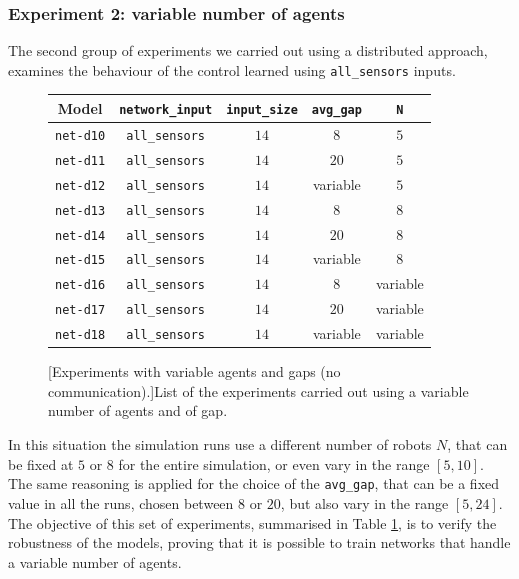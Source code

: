 \subsubsection{Experiment 2: variable number of agents}
\label{subsubsec:task1-exp-distr-2}
The second group of experiments we carried out using a distributed approach, 
examines the behaviour of the control learned using \texttt{all\_sensors} inputs. 
\begin{figure}[H]
	\centering
	\begin{tabular}{ccccc}
		\toprule
		\textbf{Model} \quad & \textbf{\texttt{network\_input}} & 
		\textbf{\texttt{input\_size}} & \textbf{\texttt{avg\_gap}} & \textbf{\texttt{N}}\\
		\midrule
		\texttt{net-d10} 	& \texttt{all\_sensors}		&  $14$  &  $8$		 	 &	$5$ \\
		\texttt{net-d11} 	& \texttt{all\_sensors}		&  $14$  &  $20$		&	$5$ \\
		\texttt{net-d12} 	& \texttt{all\_sensors}		&  $14$  &  variable   &	$5$ \\
		\texttt{net-d13} 	& \texttt{all\_sensors}	  	&  $14$  &  $8$			 &	  $8$ \\
		\texttt{net-d14} 	& \texttt{all\_sensors}	  	&  $14$  &  $20$   		&	 $8$ \\
		\texttt{net-d15} 	& \texttt{all\_sensors}	  	&  $14$  &  variable	&	 $8$ \\
		\texttt{net-d16} 	& \texttt{all\_sensors}	  	&  $14$  &  $ 8$		  &	 variable\\
		\texttt{net-d17} 	& \texttt{all\_sensors}	  	&  $14$  &  $20$		 &	variable\\
		\texttt{net-d18} 	& \texttt{all\_sensors}	  	&  $14$  &  variable	 &	
		variable\\
		\bottomrule
	\end{tabular}
	[Experiments with variable agents and gaps (no 
	communication).]{List of the experiments carried out using a variable 
		number of agents and of gap.}
	\label{tab:modeldist}
\end{figure}
In this situation the simulation runs use a different number of robots $N$, that 
can be fixed at $5$ or $8$ for the entire simulation, or even vary in the range $[5, 
10]$. The same reasoning is applied for the choice of the \texttt{avg\_gap}, that 
can be a fixed value in all the runs, chosen between $8$ or $20$, but also vary in 
the range $[5, 24]$. 
The objective of this set of experiments, summarised in Table \ref{tab:modeldist}, 
is to verify the robustness of the models, proving that it is possible to train 
networks that handle a variable number of agents. 


